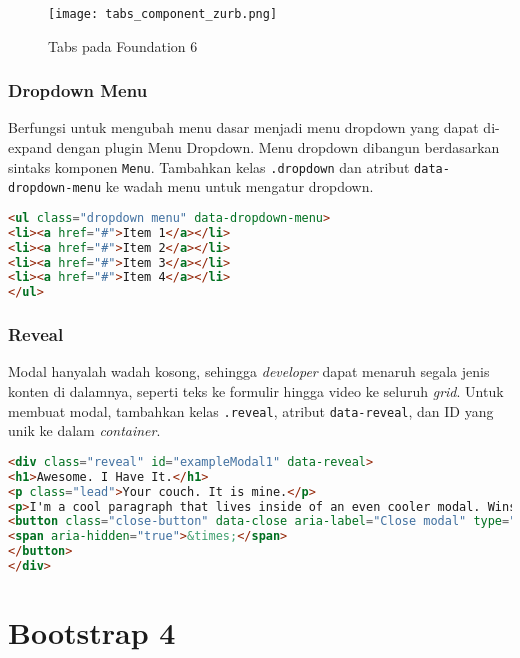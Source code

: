 \begin{figure} [H]
	\centering  
	\texttt{[image: tabs\_component\_zurb.png]}  
	\caption{Tabs pada Foundation 6}
	\label{fig:tabsFoundation}
\end{figure}

\subsubsection{Dropdown Menu}
Berfungsi untuk mengubah menu dasar menjadi menu dropdown yang dapat di-expand dengan plugin Menu Dropdown.
Menu dropdown dibangun berdasarkan sintaks komponen \texttt{Menu}. Tambahkan kelas \texttt{.dropdown} dan atribut \texttt{data-dropdown-menu} ke wadah menu untuk mengatur dropdown. 
\begin{lstlisting}[language=HTML,  basicstyle=\ttfamily, frame=single, columns=fullflexible, keepspaces=true, breaklines=true, showstringspaces=false, label={lst:dropdownMenuFoundation}, caption=Dropdown menu pada foundation 6.] 
<ul class="dropdown menu" data-dropdown-menu>
<li><a href="#">Item 1</a></li>
<li><a href="#">Item 2</a></li>
<li><a href="#">Item 3</a></li>
<li><a href="#">Item 4</a></li>
</ul>
\end{lstlisting}

\subsubsection{Reveal}
Modal hanyalah wadah kosong, sehingga \textit{developer} dapat menaruh segala jenis konten di dalamnya, seperti teks ke formulir hingga video ke seluruh \textit{grid}.
Untuk membuat modal, tambahkan kelas \texttt{.reveal}, atribut \texttt{data-reveal}, dan ID yang unik ke dalam \textit{container}.

\begin{lstlisting}[language=HTML,  basicstyle=\ttfamily, frame=single, columns=fullflexible, keepspaces=true, breaklines=true, showstringspaces=false, label={lst:revealFoundation}, caption=Reveal pada foundation 6.]  
<div class="reveal" id="exampleModal1" data-reveal>
<h1>Awesome. I Have It.</h1>
<p class="lead">Your couch. It is mine.</p>
<p>I'm a cool paragraph that lives inside of an even cooler modal. Wins!</p>
<button class="close-button" data-close aria-label="Close modal" type="button">
<span aria-hidden="true">&times;</span>
</button>
</div>
\end{lstlisting} 

\section{Bootstrap 4}
